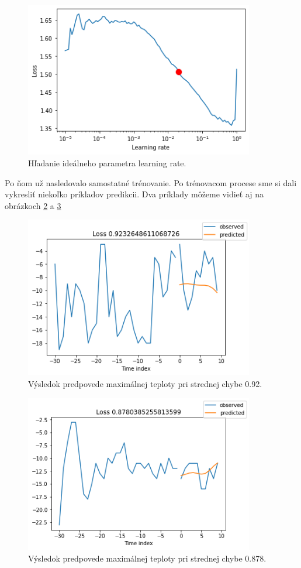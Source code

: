 \begin{figure}[!htbp]
  \centering
  \includegraphics[width=10cm]{img/n-beats-lr.png}
  \caption{Hľadanie ideálneho parametra learning rate.}
  \label{lr-tune}
\end{figure}

\newpage
Po ňom už nasledovalo samostatné trénovanie. Po trénovacom procese sme si dali vykresliť niekoľko príkladov predikcii. Dva príklady môžeme vidieť aj na obrázkoch \ref{beats_res1} a \ref{beats_res2}
\begin{figure}[!htbp]
  \centering
  \includegraphics[width=10cm]{img/beats_res1.png}
  \caption{Výsledok predpovede maximálnej teploty pri strednej chybe 0.92.}
  \label{beats_res1}
\end{figure}
\begin{figure}[!htbp]
  \centering
  \includegraphics[width=10cm]{img/beats_res2.png}
  \caption{Výsledok predpovede maximálnej teploty pri strednej chybe 0.878.}
  \label{beats_res2}
\end{figure}

